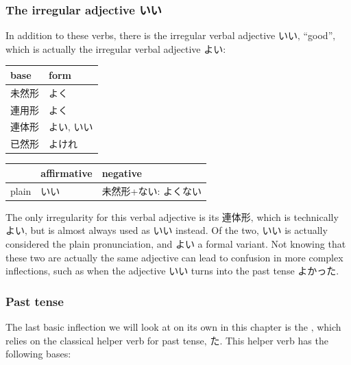 \documentclass[11pt, b5paper, twoside, openright, onecolumn]{book}
\newenvironment{mytabular}[1]{\noindent\hspace{0.4in}
\begin{tabular}[h]{#1}}{\end{tabular}}
\begin{document}
\subsubsection{The irregular adjective いい}


In addition to these verbs‚ there is the irregular verbal adjective いい‚ “good”‚ which is actually the irregular verbal adjective よい:

\vspace{0.5cm}
\smaller
\begin{mytabular}{| l  l |}\hline 
\rule{0pt}{2.4ex}base & form\\ 
\hline
\rule{0pt}{2.4ex}未然形 & \index[japanese]{よく}よく\\ 
\rule{0pt}{2.4ex}連用形 & よく\\ 
\rule{0pt}{2.4ex}連体形 & よい‚ いい\\ 
\rule{0pt}{2.4ex}已然形 & よけれ\\ 
\hline 
\end{mytabular}
\larger
\vspace{0.5cm}

\smaller
\begin{mytabular}{| l  l  l |}\hline 
\rule{0pt}{2.4ex} & affirmative & negative\\ 
\hline
\rule{0pt}{2.4ex}plain & いい & 未然形+ない: よくない\\ 
\hline 
\end{mytabular}
\larger
\vspace{0.5cm}


The only irregularity for this verbal adjective is its 連体形‚ which is technically よい‚ but is almost always used as いい instead. Of the two‚ いい is actually considered the plain pronunciation‚ and よい a formal variant. Not knowing that these two are actually the same adjective can lead to confusion in more complex inflections‚ such as when the adjective いい turns into the past tense よかった.

\subsubsection{Past tense}

The last basic inflection we will look at on its own in this chapter is the ‚ which relies on the classical helper verb for past tense‚ た. This helper verb has the following bases:
\end{document}
